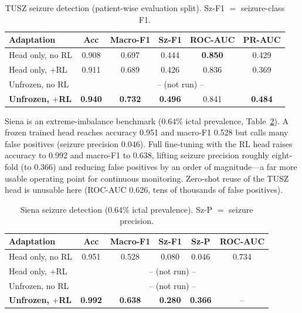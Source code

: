 \documentclass[journal]{IEEEtran}
\newcommand{\best}[1]{\textbf{#1}}
\begin{document}
\begin{table}[t]
\centering
\caption{TUSZ seizure detection (patient-wise evaluation split). Sz-F1 $=$
seizure-class F1.}
\label{tab:tusz}
\scriptsize
\setlength{\tabcolsep}{3pt}
\begin{tabular}{@{}lccccc@{}}
\toprule
Adaptation & Acc & Macro-F1 & Sz-F1 & ROC-AUC & PR-AUC \\
\midrule
Head only, no RL       & 0.908 & 0.697 & 0.444 & \best{0.850} & 0.429 \\
Head only, $+$RL       & 0.911 & 0.689 & 0.426 & 0.836 & 0.369 \\
Unfrozen, no RL        & \multicolumn{5}{c}{-- (not run) --} \\
\textbf{Unfrozen, $+$RL} & \best{0.940} & \best{0.732} & \best{0.496} & 0.841 & \best{0.484} \\
\bottomrule
\end{tabular}
\end{table}

Siena is an extreme-imbalance benchmark ($0.64\%$ ictal prevalence,
Table~\ref{tab:siena}). A frozen trained head reaches accuracy \num{0.951} and
macro-F1 \num{0.528} but calls many false positives (seizure precision
\num{0.046}). Full fine-tuning with the RL head raises accuracy to \num{0.992}
and macro-F1 to \num{0.638}, lifting seizure precision roughly eight-fold (to
\num{0.366}) and reducing false positives by an order of magnitude---a far more
usable operating point for continuous monitoring. Zero-shot reuse of the TUSZ
head is unusable here (ROC-AUC \num{0.626}, tens of thousands of false
positives).

\begin{table}[t]
\centering
\caption{Siena seizure detection ($0.64\%$ ictal prevalence). Sz-P $=$ seizure
precision.}
\label{tab:siena}
\scriptsize
\setlength{\tabcolsep}{3pt}
\begin{tabular}{@{}lccccc@{}}
\toprule
Adaptation & Acc & Macro-F1 & Sz-F1 & Sz-P & ROC-AUC \\
\midrule
Head only, no RL       & 0.951 & 0.528 & 0.080 & 0.046 & 0.734 \\
Head only, $+$RL       & \multicolumn{5}{c}{-- (not run) --} \\
Unfrozen, no RL        & \multicolumn{5}{c}{-- (not run) --} \\
\textbf{Unfrozen, $+$RL} & \best{0.992} & \best{0.638} & \best{0.280} & \best{0.366} & -- \\
\bottomrule
\end{tabular}
\end{table}
\end{document}
